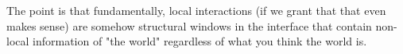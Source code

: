 The point is that fundamentally, local interactions (if we grant that that even makes sense) are somehow structural windows in the interface that contain non-local information of "the world" regardless of what you think the world is.









